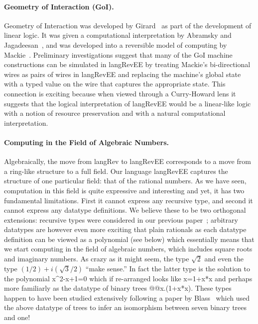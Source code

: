 \documentclass[preprint]{sigplanconf}
\begin{document}
\paragraph*{Geometry of Interaction (GoI).}
Geometry of Interaction was developed by Girard~\cite{girard1989geometry} as part of
the development of linear logic. It was given a computational interpretation
by Abramsky and Jagadeesan~\cite{Abramsky:1994:NFG:184662.184664}, and was
developed into a reversible model of computing by
Mackie~\cite{Mackie2011,DBLP:conf/popl/Mackie95}. Preliminary investigations
suggest that many of the GoI machine constructions can be simulated in
{{langRevEE}} by treating Mackie's bi-directional wires as pairs of wires in
{{langRevEE}} and replacing the machine's global state with a typed value on
the wire that captures the appropriate state. This connection is exciting
because when viewed through a Curry-Howard lens it suggests that the logical
interpretation of {{langRevEE}} would be a linear-like logic with a notion of
resource preservation and with a natural computational interpretation. 

\paragraph*{Computing in the Field of Algebraic Numbers.}
\label{sec:algebraic-field}
Algebraically, the move from {{langRev}} to {{langRevEE}} corresponds to a
move from a ring-like structure to a full field. Our language {{langRevEE}}
captures the structure of one particular field: that of the rational
numbers. As we have seen, computation in this field is quite expressive and
interesting and yet, it has two fundamental limitations. First it cannot
express any recursive type, and second it cannot express any datatype
definitions. We believe these to be two orthogonal extensions: recursive
types were considered in our previous paper~\cite{infeffects}; arbitrary
datatypes are however even more exciting that plain rationals as each
datatype definition can be viewed as a polynomial (see below) which
essentially means that we start computing in the field of algebraic numbers,
which includes square roots and imaginary numbers. As crazy as it might seem,
the type $\sqrt{2}$ and even the type $(1/2)+i(\sqrt{3}/2)$ ``make sense.''
In fact the latter type is the solution to the polynomial {{x^2-x+1=0}} which
if re-arranged looks like {{x=1+x*x}} and perhaps more familiarly as the
datatype of binary trees {{@@x.(1+x*x)}}. These types happen to have been
studied extensively following a paper by Blass~\cite{seventrees} which used
the above datatype of trees to infer an isomorphism between seven binary
trees and one!
\end{document}
